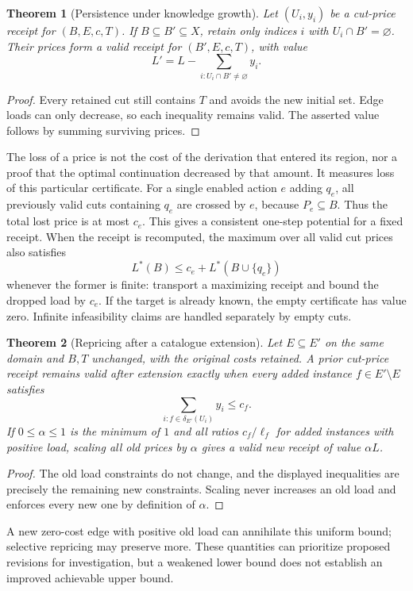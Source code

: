 \documentclass[11pt]{article}
\newtheorem{theorem}{Theorem}[section]
\theoremstyle{remark}\newtheorem{remark}[theorem]{Remark}
\begin{document}
\begin{theorem}[Persistence under knowledge growth]\label{thm:persist}
Let $(U_i,y_i)$ be a cut-price receipt for $(B,E,c,T)$. If $B\subseteq B'\subseteq X$, retain only indices $i$ with $U_i\cap B'=\varnothing$. Their prices form a valid receipt for $(B',E,c,T)$, with value
\[
L'=L-\sum_{i:U_i\cap B'\ne\varnothing}y_i.
\]
\end{theorem}
\begin{proof}
Every retained cut still contains $T$ and avoids the new initial set. Edge loads can only decrease, so each inequality remains valid. The asserted value follows by summing surviving prices.
\end{proof}
The loss of a price is not the cost of the derivation that entered its region, nor a proof that the optimal continuation decreased by that amount. It measures loss of this particular certificate. For a single enabled action $e$ adding $q_e$, all previously valid cuts containing $q_e$ are crossed by $e$, because $P_e\subseteq B$. Thus the total lost price is at most $c_e$. This gives a consistent one-step potential for a fixed receipt. When the receipt is recomputed, the maximum over all valid cut prices also satisfies
\[
L^*(B)\leq c_e+L^*(B\cup\{q_e\})
\]
whenever the former is finite: transport a maximizing receipt and bound the dropped load by $c_e$. If the target is already known, the empty certificate has value zero. Infinite infeasibility claims are handled separately by empty cuts.

\begin{theorem}[Repricing after a catalogue extension]\label{thm:reprice}
Let $E\subseteq E'$ on the same domain and $B,T$ unchanged, with the original costs retained. A prior cut-price receipt remains valid after extension exactly when every added instance $f\in E'\setminus E$ satisfies
\[
\sum_{i:f\in\delta_{E'}(U_i)}y_i\leq c_f.
\]
If $0\leq\alpha\leq1$ is the minimum of $1$ and all ratios $c_f/\ell_f$ for added instances with positive load, scaling all old prices by $\alpha$ gives a valid new receipt of value $\alpha L$.
\end{theorem}
\begin{proof}
The old load constraints do not change, and the displayed inequalities are precisely the remaining new constraints. Scaling never increases an old load and enforces every new one by definition of $\alpha$.
\end{proof}
A new zero-cost edge with positive old load can annihilate this uniform bound; selective repricing may preserve more. These quantities can prioritize proposed revisions for investigation, but a weakened lower bound does not establish an improved achievable upper bound.
\end{document}
